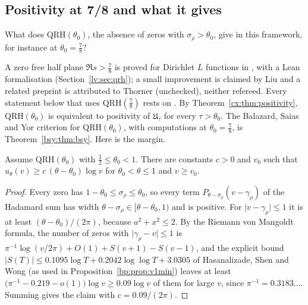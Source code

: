\subsection{Positivity at 7/8 and what it gives}

\begin{problem}\label{cf:op:qrh78}
What does $\mathrm{QRH}(\theta_0)$, the absence of zeros with $\sigma_\rho>\theta_0$, give in this framework, for instance at $\theta_0=\frac78$?
\end{problem}

A zero free half plane $\Re s>\frac78$ is proved for Dirichlet $L$ functions in \cite{OAI26a}, with a Lean formalisation (Section~\ref{lv:sec:qrh}); a small improvement is claimed by Liu and a related preprint is attributed to Thorner (unchecked), neither refereed. Every statement below that uses $\mathrm{QRH}(\frac78)$ rests on \cite{OAI26a}. By Theorem~\ref{cx:thm:positivity}, $\mathrm{QRH}(\theta_0)$ is equivalent to positivity of $\mathfrak U_\tau$ for every $\tau>\theta_0$. The Balazard, Saias and Yor criterion for $\mathrm{QRH}(\theta_0)$, with computations at $\theta_0=\frac78$, is Theorem~\ref{bsy:thm:bsy}. Here is the margin.

\begin{proposition}\label{cf:prop:margin}
Assume $\mathrm{QRH}(\theta_0)$ with $\frac12\le\theta_0<1$. There are constants $c>0$ and $v_0$ such that $u_\theta(v)\ge c\,(\theta-\theta_0)\log v$ for $\theta_0<\theta\le1$ and $v\ge v_0$.
\end{proposition}

\begin{proof}
Every zero has $1-\theta_0\le\sigma_\rho\le\theta_0$, so every term $P_{\theta-\sigma_\rho}(v-\gamma_\rho)$ of the Hadamard sum has width $\theta-\sigma_\rho\in[\theta-\theta_0,1)$ and is positive. For $\lvert v-\gamma_\rho\rvert\le1$ it is at least $(\theta-\theta_0)/(2\pi)$, because $a^2+x^2\le2$. By the Riemann von Mangoldt formula, the number of zeros with $\lvert\gamma_\rho-v\rvert\le1$ is $\pi^{-1}\log(v/2\pi)+O(1)+S(v+1)-S(v-1)$, and the explicit bound $\lvert S(T)\rvert\le0.1095\log T+0.2042\log\log T+3.0305$ of Hasanalizade, Shen and Wong \cite{HSW22} (as used in Proposition~\ref{bp:prop:v1min}) leaves at least $\bigl(\pi^{-1}-0.219-o(1)\bigr)\log v\ge0.09\log v$ of them for large $v$, since $\pi^{-1}=0.3183\ldots$. Summing gives the claim with $c=0.09/(2\pi)$.
\end{proof}

